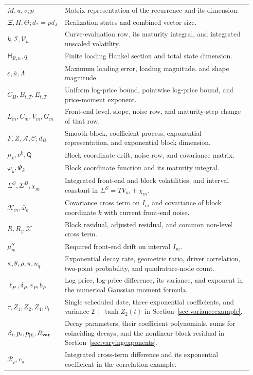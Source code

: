 {\begin{longtable}{p{.31\linewidth}p{.60\linewidth}}
$M,u,v;p$ & Matrix representation of the recurrence and its dimension.\\
$\Xi,\Pi,\Theta;d_*=p d_\lambda$ & Realization states and combined vector size.\\
$k,\mathcal I,\mathcal V_a$ & Curve-evaluation row, its maturity integral, and integrated unscaled volatility.\\
$\mathsf H_{R,n},q$ & Finite loading Hankel section and total state dimension.\\
$\varepsilon,\bar a,\Lambda$ & Maximum loading error, loading magnitude, and shape magnitude.\\
$C_H,B_{t,T},E_{t,T}$ & Uniform log-price bound, pointwise log-price bound, and price-moment exponent.\\
$L_m,C_m,V_m,G_m$ & Front-end level, slope, noise row, and maturity-step change of that row.\\
$F,Z,\mathcal A,\mathcal C;d_B$ & Smooth block, coefficient process, exponential representation, and exponential block dimension.\\
$\mu_k,\nu^k,\mathsf Q$ & Block coordinate drift, noise row, and covariance matrix.\\
$\varphi_k,\Phi_k$ & Block coordinate function and its maturity integral.\\
$\Sigma^S,\Sigma^B,\chi_m$ & Integrated front-end and block volatilities, and interval constant in $\Sigma^S=TV_m+\chi_m$.\\
$\mathcal K_m,\bar\omega_k$ & Covariance cross term on $I_m$ and covariance of block coordinate $k$ with current front-end noise.\\
$R,R_\sharp,\mathcal X$ & Block residual, adjusted residual, and common non-level cross term.\\
$\mu_m^S$ & Required front-end drift on interval $I_m$.\\
$\kappa,\theta,\rho,\pi,n_q$ & Exponential decay rate, geometric ratio, driver correlation, two-point probability, and quadrature-node count.\\
$\ell_P,\delta_P,v_P,b_P$ & Log price, log-price difference, its variance, and exponent in the numerical Gaussian moment formula.\\
$\tau,Z_1,Z_2,Z_4,v_t$ & Single scheduled date, three exponential coefficients, and variance $2+\tanh Z_2(t)$ in Section~\ref{sec:varianceexample}.\\
$\beta_i,p_i,p_{[i]},R_{\rm var}$ & Decay parameters, their coefficient polynomials, sums for coinciding decays, and the nonlinear block residual in Section~\ref{sec:varyingexponents}.\\
$\mathcal R_\rho,c_\rho$ & Integrated cross-term difference and its exponential coefficient in the correlation example.\\
\end{longtable}
}
